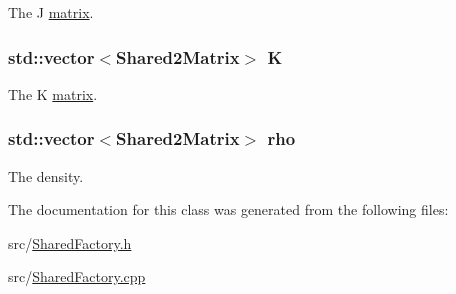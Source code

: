 The J \hyperlink{classJKBuilder_1_1matrix}{matrix}. \hypertarget{classJKBuilder_1_1SharedFactory_a59469c5d5576ee51c033626879e699b1}{
\subsubsection[{K}]{\setlength{\rightskip}{0pt plus 5cm}std::vector$<${\bf Shared2Matrix}$>$ {\bf K}}}
\label{classJKBuilder_1_1SharedFactory_a59469c5d5576ee51c033626879e699b1}


The K \hyperlink{classJKBuilder_1_1matrix}{matrix}. \hypertarget{classJKBuilder_1_1SharedFactory_af21e4022fc5e357635e5b22bb359fcba}{
\subsubsection[{rho}]{\setlength{\rightskip}{0pt plus 5cm}std::vector$<${\bf Shared2Matrix}$>$ {\bf rho}}}
\label{classJKBuilder_1_1SharedFactory_af21e4022fc5e357635e5b22bb359fcba}


The density. 

The documentation for this class was generated from the following files:\begin{DoxyCompactItemize}
\item 
src/\hyperlink{SharedFactory_8h}{SharedFactory.h}\item 
src/\hyperlink{SharedFactory_8cpp}{SharedFactory.cpp}\end{DoxyCompactItemize}
